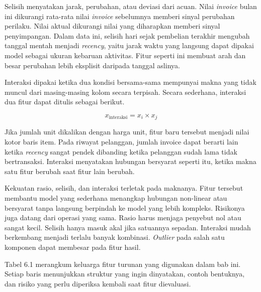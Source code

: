 Selisih menyatakan jarak, perubahan, atau deviasi dari acuan. Nilai \emph{invoice} bulan ini dikurangi rata-rata nilai \emph{invoice} sebelumnya memberi sinyal perubahan perilaku. Nilai aktual dikurangi nilai yang diharapkan memberi sinyal penyimpangan. Dalam data ini, selisih hari sejak pembelian terakhir mengubah tanggal mentah menjadi \emph{recency}, yaitu jarak waktu yang langsung dapat dipakai model sebagai ukuran kebaruan aktivitas. Fitur seperti ini membuat arah dan besar perubahan lebih eksplisit daripada tanggal aslinya.

Interaksi dipakai ketika dua kondisi bersama-sama mempunyai makna yang tidak muncul dari masing-masing kolom secara terpisah. Secara sederhana, interaksi dua fitur dapat ditulis sebagai berikut.

\[
x_{\text{interaksi}} = x_i \times x_j
\]

Jika jumlah unit dikalikan dengan harga unit, fitur baru tersebut menjadi nilai kotor baris item. Pada riwayat pelanggan, jumlah invoice dapat berarti lain ketika \emph{recency} sangat pendek dibanding ketika pelanggan sudah lama tidak bertransaksi. Interaksi menyatakan hubungan bersyarat seperti itu, ketika makna satu fitur berubah saat fitur lain berubah.

Kekuatan rasio, selisih, dan interaksi terletak pada maknanya. Fitur tersebut membantu model yang sederhana menangkap hubungan non-linear atau bersyarat tanpa langsung berpindah ke model yang lebih kompleks. Risikonya juga datang dari operasi yang sama. Rasio harus menjaga penyebut nol atau sangat kecil. Selisih hanya masuk akal jika satuannya sepadan. Interaksi mudah berkembang menjadi terlalu banyak kombinasi. \emph{Outlier} pada salah satu komponen dapat membesar pada fitur hasil.

Tabel 6.1 merangkum keluarga fitur turunan yang digunakan dalam bab ini. Setiap baris menunjukkan struktur yang ingin dinyatakan, contoh bentuknya, dan risiko yang perlu diperiksa kembali saat fitur dievaluasi.



